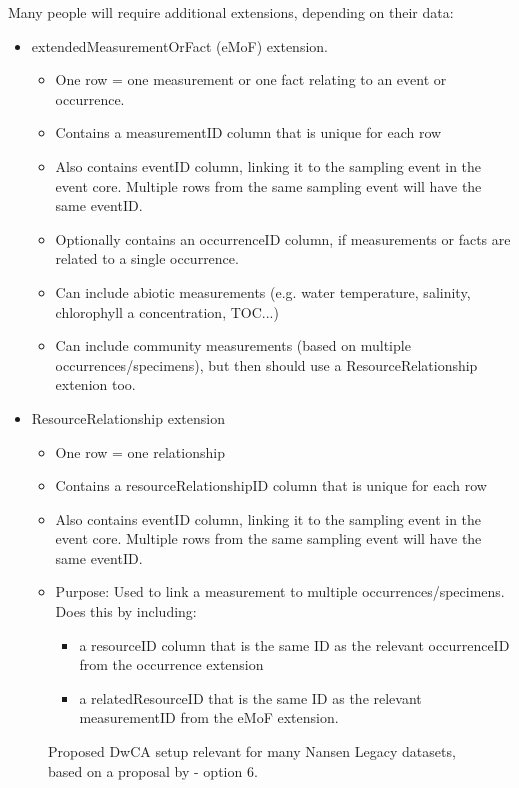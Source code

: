 \documentclass[a4paper,english, 11pt]{article}
\begin{document}
Many people will require additional extensions, depending on their data:

\begin{itemize}
\item extendedMeasurementOrFact (eMoF) extension.
\begin{itemize}
\item One row = one measurement or one fact relating to an event or occurrence.
\item Contains a measurementID column that is unique for each row
\item Also contains eventID column, linking it to the sampling event in the event core. Multiple rows from the same sampling event will have the same eventID.
\item Optionally contains an occurrenceID column, if measurements or facts are related to a single occurrence.
\item Can include abiotic measurements (e.g. water temperature, salinity, chlorophyll a concentration, TOC...)
\item Can include community measurements (based on multiple occurrences/specimens), but then should use a ResourceRelationship extenion too. 
\end{itemize}
\item ResourceRelationship extension
\begin{itemize}
\item One row = one relationship
\item Contains a resourceRelationshipID column that is unique for each row
\item Also contains eventID column, linking it to the sampling event in the event core. Multiple rows from the same sampling event will have the same eventID.
\item Purpose: Used to link a measurement to multiple occurrences/specimens. Does this by including:
\begin{itemize}
\item a resourceID column that is the same ID as the relevant occurrenceID from the occurrence extension 
\item a relatedResourceID that is the same ID as the relevant measurementID from the eMoF extension.  
\end{itemize}
\end{itemize}
\end{itemize}

\begin{figure}[htb]
    \caption{\label{fig:dwca_aen}
        Proposed DwCA setup relevant for many Nansen Legacy datasets, based on a proposal by \cite{de2017toward} - option 6.
    }
\end{figure}
\end{document}

